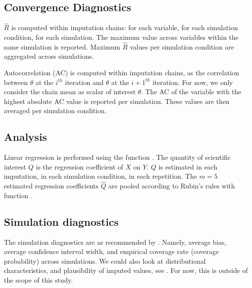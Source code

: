 \documentclass[article]{jss}
\newcommand{\fct}[1]{\code{#1()}}
\begin{document}
\subsection{Convergence Diagnostics}

$\widehat{R}$ is computed within imputation chains: for each variable, for each simulation condition, for each simulation. The maximum value across variables within the same simulation is reported. Maximum $\widehat{R}$ values per simulation condition are aggregated across simulations.

Autocorrelation (AC) is computed within imputation chains, as the correlation between $\theta$ at the $i^{th}$ iteration and $\theta$ at the $i+1^{th}$ iteration. For now, we only consider the chain mean as scalar of interest $\theta$. The AC of the variable with the highest absolute AC value is reported per simulation. These values are then averaged per simulation condition.


\subsection{Analysis}

Linear regression is performed using the  function \fct{lm}. The quantity of scientific interest $Q$ is the regression coefficient of $X$ on $Y$. $Q$ is estimated in each imputation, in each simulation condition, in each repetition. The $m = 5$ estimated regression coefficients $\hat{Q}$ are pooled according to Rubin's \citeyear{rubin87} rules with  function \fct{pool}.

\subsection{Simulation diagnostics}
The simulation diagnostics are as recommended by \cite{buur18}. Namely, average bias, average confidence interval width, and empirical coverage rate (coverage probability) across simulations. %
We could also look at distributional characteristics, and plausibility of imputed values, see \cite{vinknd}. For now, this is outside of the scope of this study. %
\end{document}

